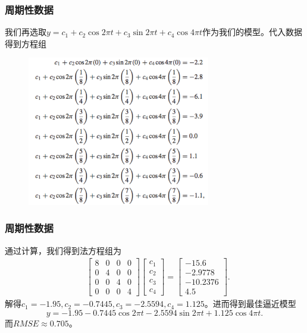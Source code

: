 \documentclass[10pt]{beamer}
\begin{document}
\begin{frame}
\frametitle{周期性数据}
我们再选取$y = c_1 + c_2 \cos 2\pi t + c_3 \sin 2\pi t + c_4 \cos 4 \pi t$作为我们的模型。代入数据得到方程组
\begin{figure}
\includegraphics[width=8cm]{figs/4-2-1_Perriodic_Data-4} 
\end{figure}
\end{frame}


\begin{frame}
\frametitle{周期性数据}
通过计算，我们得到法方程组为
\begin{align}
&\left[ \begin{array}{cccc}
     8    & 0   & 0  & 0 \\
     0    &   4 & 0 & 0\\
     0    & 0  & 4  & 0 \\
     0    &  0 & 0  &4                   
            \end{array} \right] 
\left[ \begin{array}{c} 
      c_1 \\ c_2 \\ c_3 \\c_4 \end{array} \right] 
=
\left[ \begin{array}{c}
      -15.6 \\ -2.9778 \\ -10.2376 \\ 4.5  \end{array} \right] .
\end{align}
解得$c_1 = -1.95, c_2 = -0.7445, c_3 = -2.5594, c_4 = 1.125$。进而得到最佳逼近模型
\begin{equation}
y = -1.95 - 0.7445 \cos 2 \pi t - 2.5594 \sin 2\pi t + 1.125 \cos 4 \pi t.
\end{equation}
而$RMSE \approx 0.705$。
\end{frame}
\end{document}
